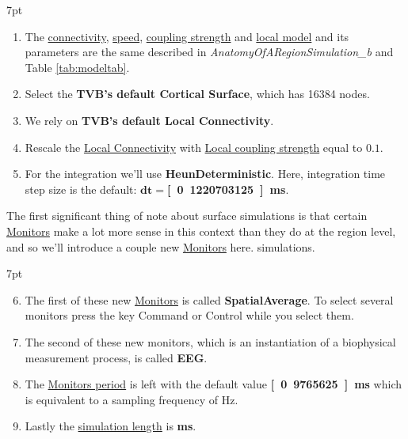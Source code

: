 \documentclass{tufte-handout}
\newenvironment{simulation}{%
  \def\FrameCommand{%
    \hspace{1pt}%
    {\color{ForestGreen}\vrule width 2pt}%
    {\color{simulationshade}\vrule width 4pt}%
    \colorbox{simulationshade}%
  }%
  \MakeFramed{\advance\hsize-\width\FrameRestore}%
  \noindent\hspace{-4.55pt}%
  \begin{adjustwidth}{}{7pt}%
  \vspace{2pt}\vspace{2pt}%
}
{%
  \vspace{2pt}\end{adjustwidth}\endMakeFramed%
}
\begin{document}
\begin{simulation}
\begin{enumerate}
\item The \underline{connectivity}, \underline{speed}, \underline{coupling strength} and \underline{local model} and its parameters are the same described in  \textit{AnatomyOfARegionSimulation\_b} and Table \ref{tab:modeltab}.
\item Select the \textbf{TVB's default Cortical Surface}, which has 16384 nodes. 
\item We rely on \textbf{TVB's default Local Connectivity}.
\item Rescale the \underline{Local Connectivity} with \underline{Local coupling strength} equal to $\mathbf{0.1}$.
\item For the integration we'll use \textbf{HeunDeterministic}.  Here, integration time step size is the default: $\mathbf{dt=}$\textbf{\unit[0.1220703125]{ms}}.
\end{enumerate}
\end{simulation}

The first significant thing of note about surface simulations is that certain \underline{Monitors} make a lot more sense in this context than they do at the region level, and so we'll introduce a couple new \underline{Monitors} here.
simulations.

\begin{simulation}
\begin{enumerate}[resume]
\setcounter{enumi}{5}
\item The first of these new \underline{Monitors} is called
\textbf{{SpatialAverage}}. To select several monitors press the key Command or Control while you select them.
\item The second of these new monitors, which is an instantiation of a
biophysical measurement process, is called \textbf{EEG}. 
\item The \underline{Monitors period} is left with the default value \textbf{\unit[0.9765625]{ms}} which is equivalent to a sampling frequency of \unit[512]{Hz}.
\item Lastly the \underline{simulation length} is \textbf{\unit[2000]{ms}}.
\end{enumerate}
\end{simulation}
\end{document}
